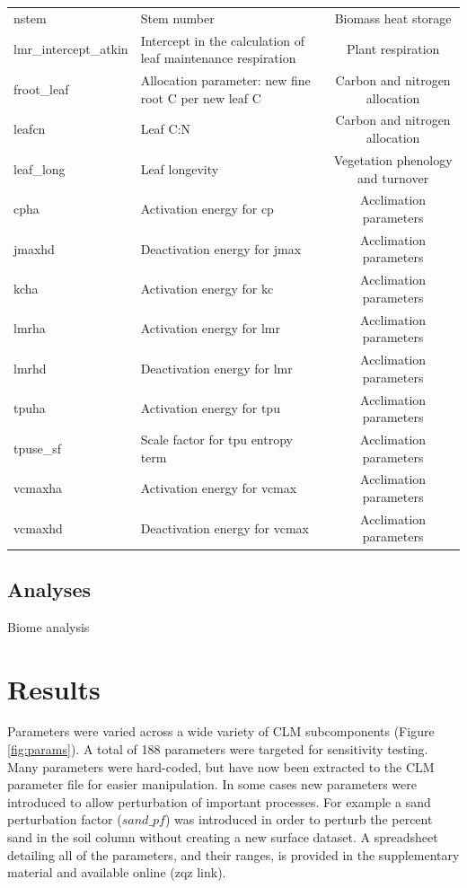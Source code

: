 \documentclass[draft]{agujournal2019}
\begin{document}
\begin{landscape}
\begin{table}[h]
\begin{tabular}{l l c}
nstem & Stem number & Biomass heat storage \\
lmr\_intercept\_atkin & Intercept in the calculation of leaf maintenance respiration& Plant respiration \\
froot\_leaf & Allocation parameter: new fine root C per new leaf C & Carbon and nitrogen allocation \\
leafcn & Leaf C:N & Carbon and nitrogen allocation \\
leaf\_long & Leaf longevity & Vegetation phenology and turnover \\
cpha & Activation energy for cp & Acclimation parameters \\
jmaxhd & Deactivation energy for jmax & Acclimation parameters \\
kcha & Activation energy for kc & Acclimation parameters \\
lmrha & Activation energy for lmr & Acclimation parameters \\
lmrhd & Deactivation energy for lmr & Acclimation parameters \\
tpuha & Activation energy for tpu & Acclimation parameters \\
tpuse\_sf & Scale factor for tpu entropy term & Acclimation parameters \\
vcmaxha & Activation energy for vcmax & Acclimation parameters \\
vcmaxhd & Deactivation energy for vcmax & Acclimation parameters \\
 \hline
 \end{tabular}
 \end{table}
\end{landscape}


\subsection{Analyses}

Biome analysis

\section{Results}

Parameters were varied across a wide variety of CLM subcomponents (Figure \ref{fig:params}). A total of 188 parameters were targeted for sensitivity testing. Many parameters were hard-coded, but have now been extracted to the CLM parameter file for easier manipulation. In some cases new parameters were introduced to allow perturbation of important processes. For example a sand perturbation factor ($sand\_pf$) was introduced in order to perturb the percent sand in the soil column without creating a new surface dataset. A spreadsheet detailing all of the parameters, and their ranges, is provided in the supplementary material and available online (zqz link).
\end{document}

